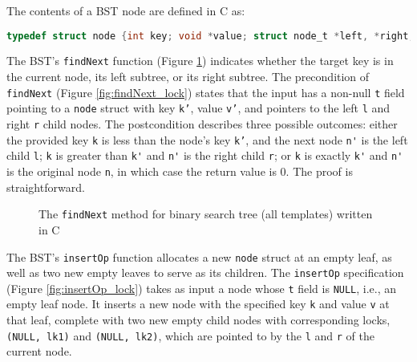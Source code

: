\documentclass[a4paper,UKenglish,cleveref, autoref, thm-restate]{lipics-v2021}
\newcommand{\wm}[1]{\textbf{\textcolor{violet}{[William: #1]}}}
\begin{document}
The contents of a BST node are defined in C as:
\begin{lstlisting}[language = C, backgroundcolor=\color{white}, basicstyle=\ttfamily\footnotesize]
	typedef struct node {int key; void *value; struct node_t *left, *right;} node;
\end{lstlisting}
The BST's \lstinline{findNext} function (Figure \ref{findnext}) indicates whether the target key is in the current node, its left subtree, or its right subtree. The precondition of \texttt{findNext} (Figure \ref*{fig:findNext_lock}) states that the input has a non-null \texttt{t} field pointing to a \texttt{node} struct with key \texttt{k'}, value \texttt{v'}, and pointers to the left \texttt{l} and right \texttt{r} child nodes. The postcondition describes three possible outcomes: either the provided key \texttt{k} is less than the node's key \texttt{k'}, and the next node \lstinline{n'} is the left child \lstinline{l}; \lstinline{k} is greater than \lstinline{k'} and \lstinline{n'} is the right child \lstinline{r}; or \lstinline{k} is exactly \lstinline{k'} and \lstinline{n'} is the original node \lstinline{n}, in which case the return value is 0. The proof is straightforward. %

\begin{figure}[ht]
	 
	\caption{The \lstinline{findNext} method for binary search tree (all templates) written in C}
	\label{findnext}
\end{figure}

The BST's \lstinline{insertOp} function allocates a new \lstinline{node} struct at an empty leaf, as well as two new empty leaves to serve as its children. The \texttt{insertOp} specification (Figure \ref{fig:insertOp_lock}) takes as input a node whose \lstinline{t} field is \lstinline{NULL}, i.e., an empty leaf node. It inserts a new node with the specified key \texttt{k} and value \texttt{v} at that leaf, complete with two new empty child nodes with corresponding locks, \texttt{(NULL, lk1)} and \texttt{(NULL, lk2)}, which are pointed to by the \texttt{l} and \texttt{r} of the current node.
\end{document}
